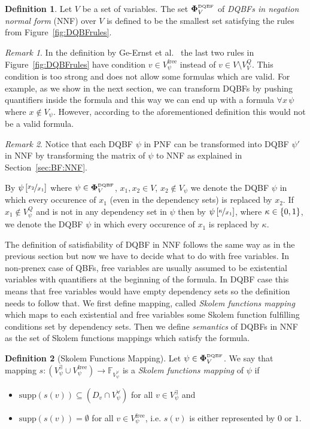\documentclass[
  digital, %
  twoside, %
  table,   %
  nolof,     %
  nolot,     %
]{fithesis3}
\let\setbuilder\set
\newcommand{\simpleset}[1]{\{{#1}\}}
\renewcommand{\set}[1]{\normalexpandarg\IfSubStr{#1}{|}{\setbuilder{#1}}{\simpleset{#1}}}
\theoremstyle{definition}
\newtheorem{definition}{Definition}
\theoremstyle{remark}
\newtheorem*{remark}{Remark}
\newcommand{\substitute}[2]{\left[ \nicefrac{#2}{#1} \right]}
\newcommand{\DQBF}[1]{\mathbf{\Phi}_{#1}^{\normalfont{\text{\tiny DQBF}}}}
\newcommand{\BFuncs}[1]{\mathbb{F}_{#1}}
\newcommand{\evars}[1]{V_{#1}^{\exists}}
\newcommand{\uvars}[1]{V_{#1}^{\forall}}
\newcommand{\fvars}[1]{V_{#1}^{\mathrm{free}}}
\newcommand{\qvars}[1]{V_{#1}^{Q}}
\newcommand{\supp}[1]{\mathrm{supp}(#1)}
\newcommand{\itholds}{\,}
\begin{document}
\begin{definition}
  Let $V$ be a set of variables. The set $\DQBF{V}$ of \emph{DQBFs in negation normal form} (NNF) over $V$ is defined to be the smallest set satisfying the rules from Figure~\ref{fig:DQBFrules}.
\end{definition}
\begin{remark}
In the definition by Ge-Ernst et al.~\cite{HQSquantifierLocalization} the last two rules in Figure~\ref{fig:DQBFrules} have condition $v \in \fvars{\psi}$ instead of $v \in V \setminus \qvars{V}$. This condition is too strong and does not allow some formulas which are valid. For example, as we show in the next section, we can transform DQBFs by pushing quantifiers inside the formula and this way we can end up with a formula $\forall x \itholds \psi$ where $x \not\in V_{\psi}$. However, according to the aforementioned definition this would not be a valid formula.
\end{remark}

\begin{remark}
Notice that each DQBF $\psi$ in PNF can be transformed into DQBF $\psi'$ in NNF by transforming the matrix of $\psi$ to NNF as explained in Section~\ref{sec:BF:NNF}.
\end{remark}

By $\psi\substitute{x_1}{x_2}$ where $\psi \in \DQBF{V}$, $x_1, x_2 \in V$, $x_2 \not\in V_{\psi}$ we denote the DQBF $\psi$ in which every occurence of $x_1$ (even in the dependency sets) is replaced by $x_2$. If $x_1 \not\in \qvars{\psi}$ and is not in any dependency set in $\psi$ then by $\psi\substitute{x_1}{\kappa}$, where $\kappa\in\set{0,1}$, we denote the DQBF $\psi$ in which every occurence of $x_1$ is replaced by $\kappa$.

The definition of satisfiability of DQBF in NNF follows the same way as in the previous section but now we have to decide what to do with free variables. In non-prenex case of QBFs, free variables are usually assumed to be existential variables with quantifiers at the beginning of the formula. In DQBF case this means that free variables would have empty dependency sets so the definition needs to follow that. We first define mapping, called \emph{Skolem functions mapping} which maps to each existential and free variables some Skolem function fulfilling conditions set by dependency sets. Then we define \emph{semantics} of DQBFs in NNF as the set of Skolem functions mappings which satisfy the formula.

\begin{definition}[Skolem Functions Mapping]
  Let $\psi \in \DQBF{V}$. We say that mapping $s\colon (\evars{\psi} \cup \fvars{\psi}) \to \BFuncs{\uvars{\psi}}$ is a \emph{Skolem functions mapping} of $\psi$ if
  \begin{itemize}
      \item $\supp{s(v)} \subseteq (D_v \cap \uvars{\psi})$ for all $v \in \evars{\psi}$ and
      \item $\supp{s(v)} = \emptyset$ for all $v \in \fvars{\psi}$, i.e. $s(v)$ is either represented by $0$ or $1$.
  \end{itemize}
\end{definition}
\end{document}
